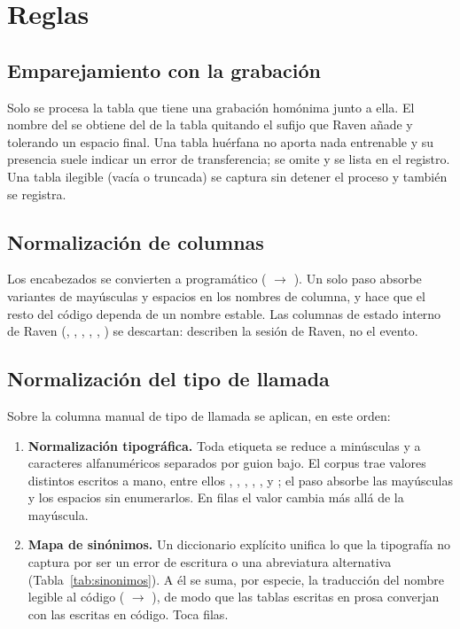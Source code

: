\documentclass[12pt,a4paper]{article}
\begin{document}
\section{Reglas}

\subsection{Emparejamiento con la grabación}

Solo se procesa la tabla que tiene una grabación homónima junto a ella. El nombre del
 se obtiene del de la tabla quitando el sufijo  que Raven
añade y tolerando un espacio final. Una tabla huérfana no aporta nada entrenable y su presencia
suele indicar un error de transferencia; se omite y se lista en el registro. Una tabla ilegible
(vacía o truncada) se captura sin detener el proceso y también se registra.

\subsection{Normalización de columnas}

Los encabezados se convierten a  programático ( $\to$
). Un solo paso absorbe variantes de mayúsculas y espacios en los nombres
de columna, y hace que el resto del código dependa de un nombre estable. Las columnas de estado
interno de Raven (, , , ,
, ) se descartan: describen la sesión de Raven, no el
evento.

\subsection{Normalización del tipo de llamada}
\label{sec:llamada}

Sobre la columna manual de tipo de llamada se aplican, en este orden:

\begin{enumerate}
    \item \textbf{Normalización tipográfica.} Toda etiqueta se reduce a minúsculas y a
          caracteres alfanuméricos separados por guion bajo. El corpus trae \nRawCallValues{}
          valores distintos escritos a mano, entre ellos , ,
          , , ,
           y ; el paso absorbe las mayúsculas y los espacios sin
          enumerarlos. En \nTypography{} filas el valor cambia más allá de la mayúscula.
    \item \textbf{Mapa de sinónimos.} Un diccionario explícito unifica lo que la tipografía no
          captura por ser un error de escritura o una abreviatura alternativa
          (Tabla~\ref{tab:sinonimos}). A él se suma, por especie, la traducción del nombre
          legible al código ( $\to$ ), de modo que las tablas
          escritas en prosa converjan con las escritas en código. Toca \nSynonyms{} filas.
\end{enumerate}
\end{document}
